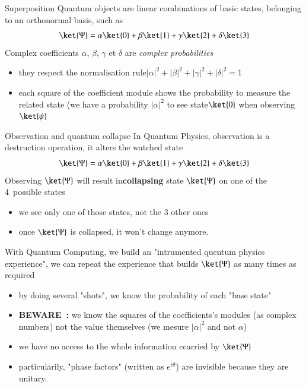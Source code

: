 \begin{frame}{Superposition}
Quantum objects are linear combinations of basic states, belonging to an orthonormal basis, such as
\begin{equation*}
    \ket{\Psi} = \alpha\ket{0}+\beta\ket{1}+\gamma\ket{2}+\delta\ket{3}
\end{equation*}
Complex coefficients $\alpha$, $\beta$, $\gamma$ et $\delta$ are \textit{complex probabilities}
\begin{itemize}
    \item they respect the normalisation rule$|\alpha|^2+|\beta|^2+|\gamma|^2+|\delta|^2 = 1$
    \item each square of the coefficient module shows the probability to measure the related state (we have a  
    probability $|\alpha|^2$ to see state$\ket{0}$ when observing $\ket{\psi}$
\end{itemize}
\end{frame}

\begin{frame}{Observation and quantum collapse}
In Quantum Physics, observation is a destruction operation, it alters the watched state
\begin{equation*}
    \ket{\Psi} = \alpha\ket{0}+\beta\ket{1}+\gamma\ket{2}+\delta\ket{3}
\end{equation*}
Observing $\ket{\Psi}$ will result in\textbf{collapsing} state $\ket{\Psi}$ on one of the 4~possible states
\begin{itemize}
    \item we see only one of those states, not the 3 other ones
    \item once $\ket{\Psi}$ is collapsed, it won't change anymore. 
\end{itemize}
With Quantum Computing, we build an "intrumented quentum physics experience", we can repeat the experience that builds
 $\ket{\Psi}$ as many times as required
\begin{itemize}
    \item by doing several "shots", we know the probability of each "base state"
    \item \textbf{BEWARE~:} we know the squares of the coefficients's modules (as complex numbers) not the value themselves
    (we mesure $|\alpha|^2$ and not $\alpha$) 
    \item we have no access to the whole information ccarried by  $\ket{\Psi}$
    \item particularily, "phase factors" (written as $e^{i\theta}$) are invisible because they are unitary. 
\end{itemize}
\end{frame}

